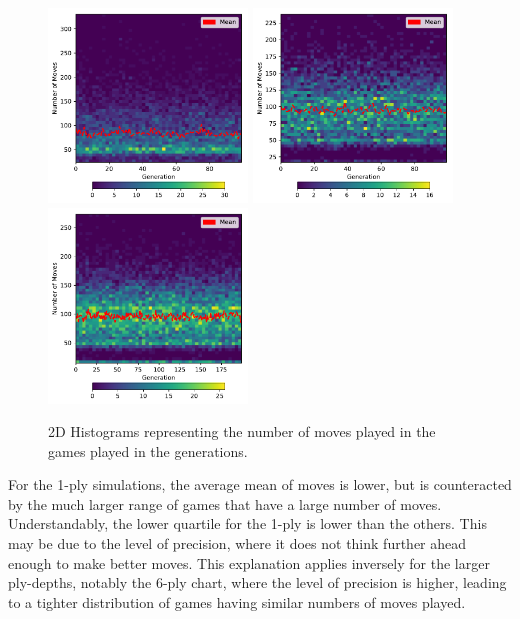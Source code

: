 \documentclass[12pt,a4paper]{article}
\begin{document}
            \begin{figure}[!ht]
                \centering
                \includegraphics[width=53mm]{images/results/1ply/moves.pdf}
                \includegraphics[width=53mm]{images/results/3ply/moves.pdf}
                \includegraphics[width=53mm]{images/results/6ply/moves.pdf}
                \caption{2D Histograms representing the number of moves played in the games played in the generations. \label{move_chart}}
            \end{figure}


            For the 1-ply simulations, the average mean of moves is lower, but is counteracted by the much larger range of games that have a large number of moves. Understandably, the lower quartile for the 1-ply is lower than the others. This may be due to the level of precision, where it does not think further ahead enough to make better moves. This explanation applies inversely for the larger ply-depths, notably the 6-ply chart, where the level of precision is higher, leading to a tighter distribution of games having similar numbers of moves played.
\end{document}
